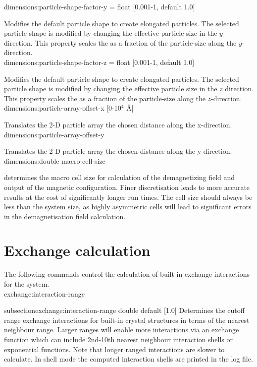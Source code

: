 {\zicf dimensions:particle-shape-factor-y = float [0.001-1, default 1.0]}
Modifies the default particle shape to create elongated particles. The selected
particle shape is modified by changing the effective particle size in the $y$
direction. This property scales the as a fraction of the particle-size along the
$y$-direction.\\

{\zicf dimensions:particle-shape-factor-z = float [0.001-1, default 1.0]}
Modifies the default particle shape to create elongated particles. The selected
particle shape is modified by changing the effective particle size in the $z$
direction. This property scales the as a fraction of the particle-size along the
$z$-direction.\\

{\zicf dimensions:particle-array-offset-x [0-10$^4$ \AA]}
Translates the 2-D particle array the chosen distance along the x-direction.\\

{\zicf dimensions:particle-array-offset-y}
Translates the 2-D particle array the chosen distance along the y-direction.\\

{\zicf dimensions:double macro-cell-size}
determines the macro cell size for calculation of the demagnetizing field and
output of the magnetic configuration. Finer discretisation leads to more
accurate results at the cost of significantly longer run times. The cell size
should always be less than the system size, as highly asymmetric cells will
lead to significant errors in the demagnetisation field calculation.

\section*{Exchange calculation}
The following commands control the calculation of built-in exchange interactions
 for the system.\\

{\zicf exchange:interaction-range}
{subsection}{exchange:interaction-range double default [1.0]}
  Determines the cutoff range exchange interactions for built-in crystal
  structures in terms of the nearest neighbour range. Larger ranges will
  enable more interactions via an exchange function which can include 2nd-10th
  nearest neighbour interaction shells or exponential functions. Note that
  longer ranged interactions are slower to calculate. In shell mode the computed
  interaction shells are printed in the log file.\\

